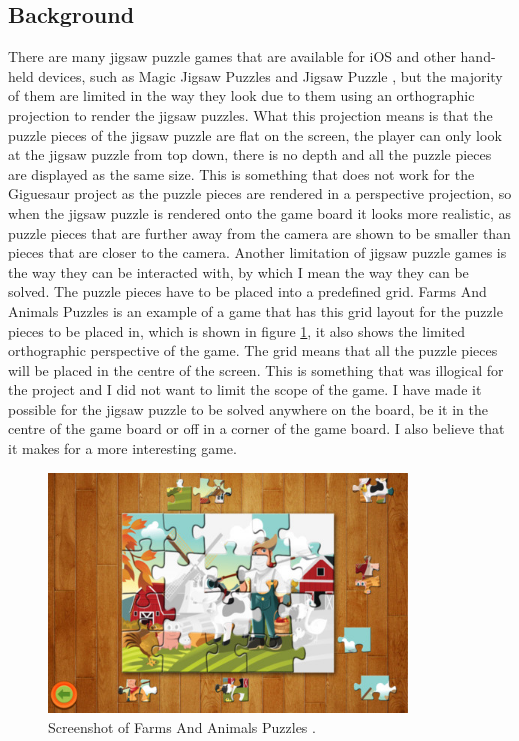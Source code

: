 \documentclass{article}
\begin{document}
\subsection{Background}
There are many jigsaw puzzle games that are available for iOS and other hand-held devices, such as Magic Jigsaw Puzzles \cite{ref:MagicJigsaw} and Jigsaw Puzzle \cite{ref:JigsawPuzzle}, but the majority of them are limited in the way they look due to them using an orthographic projection to render the jigsaw puzzles. What this projection means is that the puzzle pieces of the jigsaw puzzle are flat on the screen, the player can only look at the jigsaw puzzle from top down, there is no depth and all the puzzle pieces are displayed as the same size. This is something that does not work for the Giguesaur project as the puzzle pieces are rendered in a perspective projection, so when the jigsaw puzzle is rendered onto the game board it looks more realistic, as puzzle pieces that are further away from the camera are shown to be smaller than pieces that are closer to the camera. Another limitation of jigsaw puzzle games is the way they can be interacted with, by which I mean the way they can be solved. The puzzle pieces have to be placed into a predefined grid. Farms And Animals Puzzles \cite{ref:FarmPuzzle} is an example of a game that has this grid layout for the puzzle pieces to be placed in, which is shown in figure \ref{fig:FarmsAnimals}, it also shows the limited orthographic perspective of the game. The grid means that all the puzzle pieces will be placed in the centre of the screen. This is something that was illogical for the project and I did not want to limit the scope of the game. I have made it possible for the jigsaw puzzle to be solved anywhere on the board, be it in the centre of the game board or off in a corner of the game board. I also believe that it makes for a more interesting game.

\begin{figure}[ht]
\begin{center}
\includegraphics[width=0.85\textwidth]{images/FarmAnimalsJigsawImage}
\caption{Screenshot of Farms And Animals Puzzles \cite{img:FarmPuzzle}.}
\label{fig:FarmsAnimals}
\end{center}
\end{figure}
\end{document}
